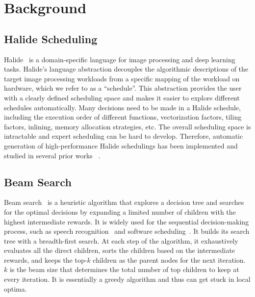 \section{Background}
\subsection{Halide Scheduling}
Halide~\cite{ragan2013halide} is a domain-specific language for image processing and deep learning tasks. 
Halide's language abstraction decouples the algorithmic descriptions of the target image processing workloads from a specific mapping of the workload on hardware, which we refer to as a ``schedule''. This abstraction provides the user with a clearly defined scheduling space and makes it easier to explore different schedules automatically.
Many decisions need to be made in a Halide schedule, including the execution order of different functions, vectorization factors, tiling factors, inlining, memory allocation strategies, etc.
The overall scheduling space is intractable and expert scheduling can be hard to develop. Therefore, automatic generation of high-performance Halide schedulings has been implemented and studied in several prior works  ~\cite{mullapudi2015polymage}\cite{mullapudi2016automatically}\cite{sioutas2019schedule}\cite{adams2019learning}.

\subsection{Beam Search}
Beam search~\cite{reddy1977speech} is a heuristic algorithm that explores a decision tree and searches for the optimal decisions by expanding a limited number of children with the highest intermediate rewards. It is widely used for the sequential decision-making process, such as speech recognition~\cite{reddy1977speech} and software scheduling~\cite{adams2019learning}. It builds its search tree with a breadth-first search. 
At each step of the algorithm, it exhaustively evaluates all the direct children, sorts the children based on the intermediate rewards, and keeps the top-$k$ children as the parent nodes for the next iteration. 
$k$ is the beam size that determines the total number of top children to keep at every iteration.
It is essentially a greedy algorithm and thus can get stuck in local optima. 

